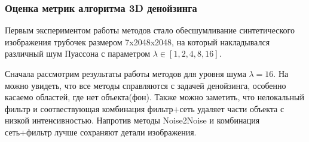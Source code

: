 \subsubsection{Оценка метрик алгоритма 3D денойзинга}
\par Первым экспериментом работы методов стало обесшумливание синтетического изображения трубочек размером 7x2048x2048, на который накладывался различный шум Пуассона с параметром $\lambda \in [1, 2, 4, 8, 16]$.
\par Сначала рассмотрим результаты работы методов для уровня шума $\lambda=16$. На  можно увидеть, что все методы справляются с задачей денойзинга, особенно касаемо областей, где нет объекта(фон). Также можно заметить, что нелокальный фильтр и соотвествующая комбинация фильтр+сеть удаляет части объекта с низкой интенсивностью. Напротив методы Noise2Noise и комбинация сеть+фильтр лучше сохраняют детали изображения.  
